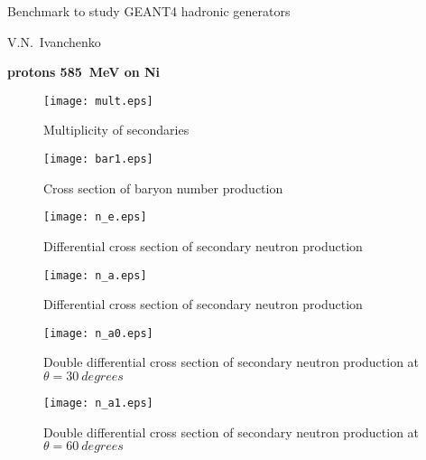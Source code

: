 \documentclass[12pt]{article}
\begin{document}
\pagestyle{empty}

\begin{center}
{\large Benchmark to study GEANT4 hadronic generators} 

\vspace*{5mm}
V.N.~Ivanchenko

\vspace*{5mm}


\vspace*{5mm}

{\bf protons 585~MeV on Ni} 

\vspace*{5mm}


\end{center}

\begin{figure}[htbp]
\caption{Multiplicity of secondaries}
\label{fig1a}  
\centerline{\texttt{[image: mult.eps]}}
\end{figure}

\begin{figure}[htbp]
\caption{Cross section of baryon number production}
\label{fig1b}  
\centerline{\texttt{[image: bar1.eps]}}
\end{figure}

\begin{figure}[htbp]
\caption{Differential cross section of secondary neutron production}
\label{fig7}  
\centerline{\texttt{[image: n\_e.eps]}}
\end{figure}
\begin{figure}[htbp]
\caption{Differential cross section of secondary neutron production}
\label{fig10} 
\centerline{\texttt{[image: n\_a.eps]}}
\end{figure}

\clearpage


\begin{figure}[htbp]
\caption{Double differential cross section of secondary neutron production at $\theta = 30~degrees$}
\label{figa0} 
\centerline{\texttt{[image: n\_a0.eps]}}
\end{figure}


\begin{figure}[htbp]
\caption{Double differential cross section of secondary neutron production at $\theta = 60~degrees$}
\label{figa1} 
\centerline{\texttt{[image: n\_a1.eps]}}
\end{figure}
\end{document}
